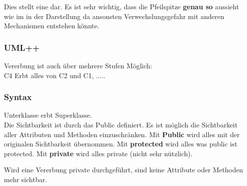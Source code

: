 Dies stellt eine  dar. 
Es ist sehr wichtig, dass die Pfeilspitze \textbf{genau so} aussieht wie im in der Darstellung da ansonsten Verwechslungsgefahr mit anderen Mechanismen entstehen könnte.

\subsubsection{UML++}

\noindent
\begin{minipage}{0.6\columnwidth}
\begin{center}
\end{center}
\end{minipage}
\begin{minipage}{0.4\columnwidth}
    Vererbung ist auch über mehrere Stufen Möglich:\\
    C4 Erbt alles von C2 und C1, .....
\end{minipage}

\subsubsection{Syntax}



Unterklasse erbt Superklasse.\\

Die Sichtbarkeit ist durch das Public definiert. 
Es ist möglich die Sichtbarkeit aller Attributen und Methoden einzuschränken. 
Mit \textbf{Public} wird alles mit der originalen Sichtbarkeit übernommen. 
Mit \textbf{protected} wird alles was public ist protected. 
Mit \textbf{private} wird alles private (nicht sehr nützlich).

Wird eine Vererbung private durchgeführt, sind keine Attribute oder Methoden mehr sichtbar.

